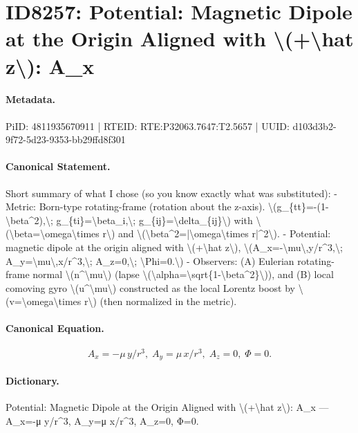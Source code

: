 \section*{ID8257: Potential: Magnetic Dipole at the Origin Aligned with \textbackslash{}(+\textbackslash{}hat z\textbackslash{}): A\_x}
\paragraph{Metadata.}
PiID: 4811935670911 | RTEID: RTE:P32063.7647:T2.5657 | UUID: d103d3b2-9f72-5d23-9353-bb29ffd8f301

\paragraph{Canonical Statement.}
Short summary of what I chose (so you know exactly what was substituted): - Metric: Born-type rotating-frame (rotation about the z-axis). \textbackslash{}(g\_\{tt\}=-(1-\textbackslash{}beta\textasciicircum{}2),\textbackslash{}; g\_\{ti\}=\textbackslash{}beta\_i,\textbackslash{}; g\_\{ij\}=\textbackslash{}delta\_\{ij\}\textbackslash{}) with \textbackslash{}(\textbackslash{}beta=\textbackslash{}omega\textbackslash{}times r\textbackslash{}) and \textbackslash{}(\textbackslash{}beta\textasciicircum{}2=|\textbackslash{}omega\textbackslash{}times r|\textasciicircum{}2\textbackslash{}). - Potential: magnetic dipole at the origin aligned with \textbackslash{}(+\textbackslash{}hat z\textbackslash{}), \textbackslash{}(A\_x=-\textbackslash{}mu\textbackslash{},y/r\textasciicircum{}3,\textbackslash{}; A\_y=\textbackslash{}mu\textbackslash{},x/r\textasciicircum{}3,\textbackslash{}; A\_z=0,\textbackslash{}; \textbackslash{}Phi=0.\textbackslash{}) - Observers: (A) Eulerian rotating-frame normal \textbackslash{}(n\textasciicircum{}\textbackslash{}mu\textbackslash{}) (lapse \textbackslash{}(\textbackslash{}alpha=\textbackslash{}sqrt\{1-\textbackslash{}beta\textasciicircum{}2\}\textbackslash{})), and (B) local comoving gyro \textbackslash{}(u\textasciicircum{}\textbackslash{}mu\textbackslash{}) constructed as the local Lorentz boost by \textbackslash{}(v=\textbackslash{}omega\textbackslash{}times r\textbackslash{}) (then normalized in the metric).

\paragraph{Canonical Equation.}
\[
A_x=-\mu\,y/r^3,\; A_y=\mu\,x/r^3,\; A_z=0,\; \Phi=0.
\]

\paragraph{Dictionary.}
Potential: Magnetic Dipole at the Origin Aligned with \textbackslash{}(+\textbackslash{}hat z\textbackslash{}): A\_x — A\_x=-μ y/r\textasciicircum{}3, A\_y=μ x/r\textasciicircum{}3, A\_z=0, Φ=0.

